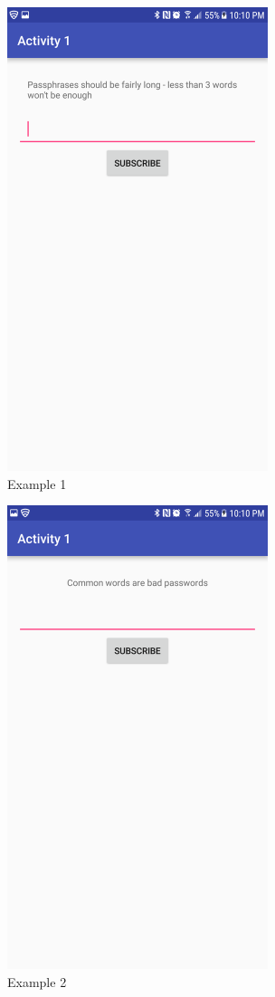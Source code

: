 \documentclass{article}
\begin{document}
\begin{figure}[ht]
      \includegraphics[width=3in]{img/t3s1.png}
      \centering
      \caption{Example 1}
\end{figure}
\begin{figure}[ht]
      \includegraphics[width=3in]{img/t3s2.png}
      \centering
      \caption{Example 2}
\end{figure}
\end{document}

